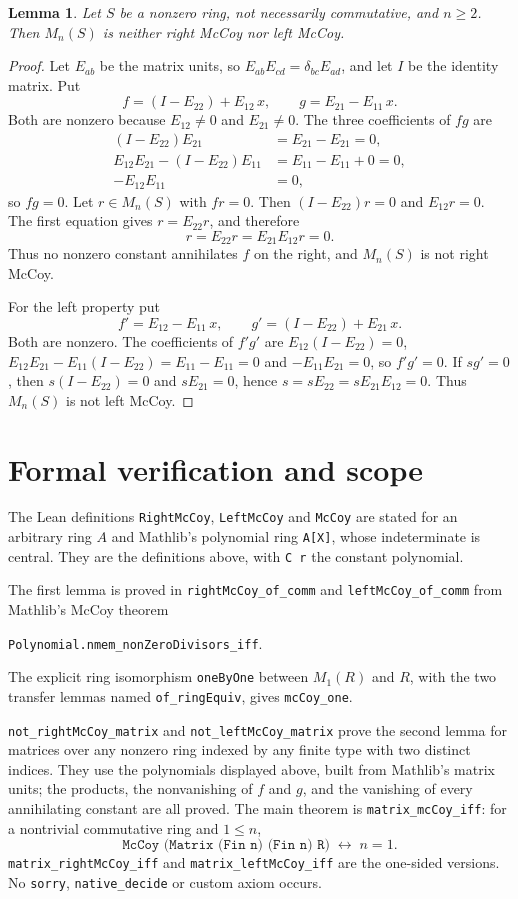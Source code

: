 \documentclass[11pt]{article}
\newtheorem{lemma}{Lemma}
\begin{document}
\begin{lemma}
Let $S$ be a nonzero ring, not necessarily commutative, and $n\ge2$.
Then $M_n(S)$ is neither right McCoy nor left McCoy.
\end{lemma}
\begin{proof}
Let $E_{ab}$ be the matrix units, so $E_{ab}E_{cd}=\delta_{bc}E_{ad}$,
and let $I$ be the identity matrix. Put
\[
 f=(I-E_{22})+E_{12}\,x,\qquad g=E_{21}-E_{11}\,x .
\]
Both are nonzero because $E_{12}\ne0$ and $E_{21}\ne0$. The three
coefficients of $fg$ are
\begin{align*}
 (I-E_{22})E_{21}&=E_{21}-E_{21}=0,\\
 E_{12}E_{21}-(I-E_{22})E_{11}&=E_{11}-E_{11}+0=0,\\
 -E_{12}E_{11}&=0,
\end{align*}
so $fg=0$. Let $r\in M_n(S)$ with $fr=0$. Then $(I-E_{22})r=0$ and
$E_{12}r=0$. The first equation gives $r=E_{22}r$, and therefore
\[
 r=E_{22}r=E_{21}E_{12}r=0 .
\]
Thus no nonzero constant annihilates $f$ on the right, and $M_n(S)$ is
not right McCoy.

For the left property put
\[
 f'=E_{12}-E_{11}\,x,\qquad g'=(I-E_{22})+E_{21}\,x .
\]
Both are nonzero. The coefficients of $f'g'$ are $E_{12}(I-E_{22})=0$,
$E_{12}E_{21}-E_{11}(I-E_{22})=E_{11}-E_{11}=0$ and $-E_{11}E_{21}=0$,
so $f'g'=0$. If $sg'=0$, then $s(I-E_{22})=0$ and $sE_{21}=0$, hence
$s=sE_{22}=sE_{21}E_{12}=0$. Thus $M_n(S)$ is not left McCoy.
\end{proof}

\section*{Formal verification and scope}
The Lean definitions \texttt{RightMcCoy}, \texttt{LeftMcCoy} and
\texttt{McCoy} are stated for an arbitrary ring $A$ and Mathlib's
polynomial ring \texttt{A[X]}, whose indeterminate is central. They are
the definitions above, with \texttt{C r} the constant polynomial.

The first lemma is proved in \texttt{rightMcCoy\_of\_comm} and
\texttt{leftMcCoy\_of\_comm} from Mathlib's McCoy theorem
\begin{center}\small\texttt{Polynomial.nmem\_nonZeroDivisors\_iff}.\end{center}
The explicit ring isomorphism \texttt{oneByOne} between $M_1(R)$ and
$R$, with the two transfer lemmas named \texttt{of\_ringEquiv}, gives
\texttt{mcCoy\_one}.

\texttt{not\_rightMcCoy\_matrix} and \texttt{not\_leftMcCoy\_matrix}
prove the second lemma for matrices over any nonzero ring indexed by
any finite type with two distinct indices. They use the polynomials
displayed above, built from Mathlib's matrix units; the products, the
nonvanishing of $f$ and $g$, and the vanishing of every annihilating
constant are all proved. The main theorem is \texttt{matrix\_mcCoy\_iff}:
for a nontrivial commutative ring and $1\le n$,
\[
 \texttt{McCoy (Matrix (Fin n) (Fin n) R)}\;\leftrightarrow\; n=1 .
\]
\texttt{matrix\_rightMcCoy\_iff} and \texttt{matrix\_leftMcCoy\_iff}
are the one-sided versions. No \texttt{sorry}, \texttt{native\_decide}
or custom axiom occurs.
\end{document}
